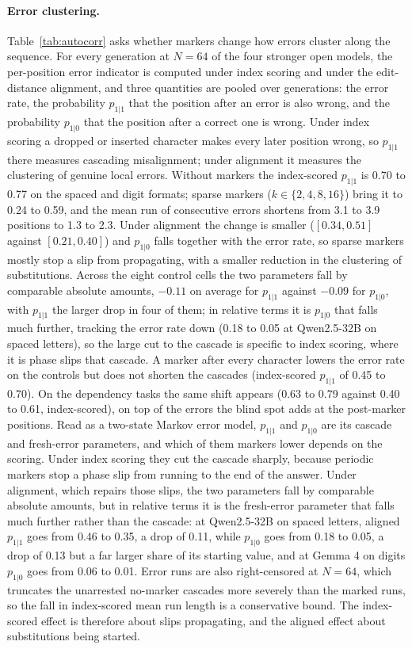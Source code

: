 \documentclass[10pt]{article} %
\begin{document}
\paragraph{Error clustering.} Table~\ref{tab:autocorr} asks whether markers change how errors cluster along the sequence. For every generation at $N = 64$ of the four stronger open models, the per-position error indicator is computed under index scoring and under the edit-distance alignment, and three quantities are pooled over generations: the error rate, the probability $p_{1|1}$ that the position after an error is also wrong, and the probability $p_{1|0}$ that the position after a correct one is wrong. Under index scoring a dropped or inserted character makes every later position wrong, so $p_{1|1}$ there measures cascading misalignment; under alignment it measures the clustering of genuine local errors. Without markers the index-scored $p_{1|1}$ is 0.70 to 0.77 on the spaced and digit formats; sparse markers ($k \in \{2,4,8,16\}$) bring it to 0.24 to 0.59, and the mean run of consecutive errors shortens from 3.1 to 3.9 positions to 1.3 to 2.3. Under alignment the change is smaller ($[0.34, 0.51]$ against $[0.21, 0.40]$) and $p_{1|0}$ falls together with the error rate, so sparse markers mostly stop a slip from propagating, with a smaller reduction in the clustering of substitutions. Across the eight control cells the two parameters fall by comparable absolute amounts, $-0.11$ on average for $p_{1|1}$ against $-0.09$ for $p_{1|0}$, with $p_{1|1}$ the larger drop in four of them; in relative terms it is $p_{1|0}$ that falls much further, tracking the error rate down (0.18 to 0.05 at Qwen2.5-32B on spaced letters), so the large cut to the cascade is specific to index scoring, where it is phase slips that cascade. A marker after every character lowers the error rate on the controls but does not shorten the cascades (index-scored $p_{1|1}$ of 0.45 to 0.70). On the dependency tasks the same shift appears (0.63 to 0.79 against 0.40 to 0.61, index-scored), on top of the errors the blind spot adds at the post-marker positions. Read as a two-state Markov error model, $p_{1|1}$ and $p_{1|0}$ are its cascade and fresh-error parameters, and which of them markers lower depends on the scoring. Under index scoring they cut the cascade sharply, because periodic markers stop a phase slip from running to the end of the answer. Under alignment, which repairs those slips, the two parameters fall by comparable absolute amounts, but in relative terms it is the fresh-error parameter that falls much further rather than the cascade: at Qwen2.5-32B on spaced letters, aligned $p_{1|1}$ goes from 0.46 to 0.35, a drop of 0.11, while $p_{1|0}$ goes from 0.18 to 0.05, a drop of 0.13 but a far larger share of its starting value, and at Gemma 4 on digits $p_{1|0}$ goes from 0.06 to 0.01. Error runs are also right-censored at $N = 64$, which truncates the unarrested no-marker cascades more severely than the marked runs, so the fall in index-scored mean run length is a conservative bound. The index-scored effect is therefore about slips propagating, and the aligned effect about substitutions being started.
\end{document}
